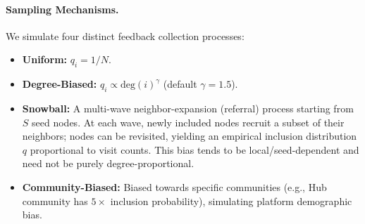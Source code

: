 \documentclass{article}
\theoremstyle{plain}
\theoremstyle{definition}
\theoremstyle{remark}
\begin{document}
\paragraph{Sampling Mechanisms.}
We simulate four distinct feedback collection processes:
\begin{itemize}
    \item \textbf{Uniform:} $q_i = 1/N$.
    \item \textbf{Degree-Biased:} $q_i \propto \text{deg}(i)^\gamma$ (default $\gamma=1.5$).
    \item \textbf{Snowball:} A multi-wave neighbor-expansion (referral) process
    starting from $S$ seed nodes. At each wave, newly included nodes recruit a
    subset of their neighbors; nodes can be revisited, yielding an empirical
    inclusion distribution $q$ proportional to visit counts. This bias tends to
    be local/seed-dependent and need not be purely degree-proportional.
    \item \textbf{Community-Biased:} Biased towards specific communities (e.g., Hub community has $5\times$ inclusion probability), simulating platform demographic bias.
\end{itemize}
\end{document}
